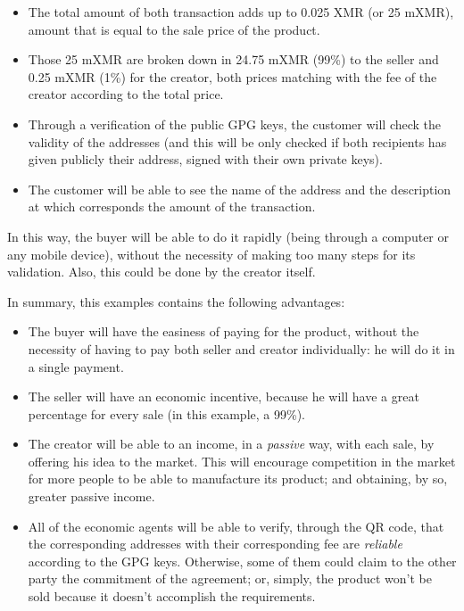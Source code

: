 \documentclass[12pt,a4paper]{article}
\begin{document}
\begin{itemize}
\item The total amount of both transaction adds up to 0.025 XMR (or 25 mXMR), amount that is equal to the sale price of the product.
\item Those 25 mXMR are broken down in 24.75 mXMR (99\%) to the seller and 0.25 mXMR (1\%) for the creator, both prices matching with the fee of the creator according to the total price.
\item Through a verification of the public GPG keys, the customer will check the validity of the addresses (and this will be only checked if both recipients has given publicly their address, signed with their own private keys).
\item The customer will be able to see the name of the address and the description at which corresponds the amount of the transaction.
\end{itemize}

In this way, the buyer will be able to do it rapidly (being through a computer or any mobile device), without the necessity of making too many steps for its validation. Also, this could be done by the creator itself.

In summary, this examples contains the following advantages:

\begin{itemize}
\item The buyer will have the easiness of paying for the product, without the necessity of having to pay both seller and creator individually: he will do it in a single payment.
\item The seller will have an economic incentive, because he will have a great percentage for every sale (in this example, a 99\%).
\item The creator will be able to an income, in a \textit{passive} way, with each sale, by offering his idea to the market. This will encourage competition in the market for more people to be able to manufacture its product; and obtaining, by so, greater passive income.
\item All of the economic agents will be able to verify, through the QR code, that the corresponding addresses with their corresponding fee are \textit{reliable} according to the GPG keys. Otherwise, some of them could claim to the other party the commitment of the agreement; or, simply, the product won't be sold because it doesn't accomplish the requirements.
\end{itemize}
\end{document}
